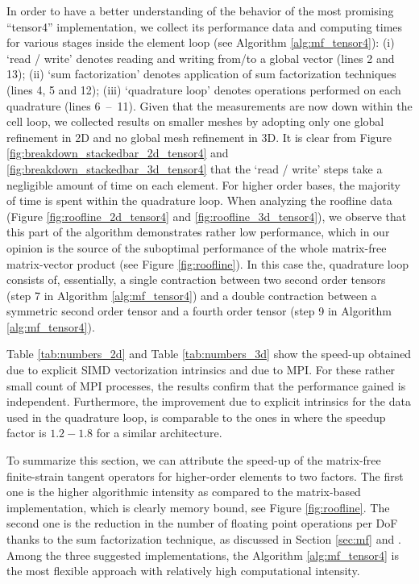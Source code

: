 \documentclass[times,doublespace]{nmeauth}
\newcommand{\changeDD}[1]{#1}
\newcommand{\changeJP}[1]{#1}
\begin{document}
\changeDD{
In order to have a better understanding of the behavior of the most promising ``tensor4'' implementation,
we collect its performance data and computing times for various stages inside the element loop (see Algorithm \ref{alg:mf_tensor4}):
(i) `read / write' denotes reading and writing from/to a global vector (\changeJP{lines 2 and 13});
(ii) `sum factorization' denotes application of sum factorization techniques (\changeJP{lines} 4, 5 and 12);
(iii) `quadrature loop' denotes operations performed on each quadrature (\changeJP{lines \mbox{6 -- 11}}).
Given that the measurements are now down within the cell loop, we collected results on smaller meshes by adopting only one
global refinement in 2D and no global mesh refinement in 3D.
It is clear from Figure \ref{fig:breakdown_stackedbar_2d_tensor4} and  \ref{fig:breakdown_stackedbar_3d_tensor4} that the
`read / write' steps take a negligible amount of time on each element.
For higher order bases, the majority of time is spent within the quadrature loop.
When analyzing the roofline data (Figure \ref{fig:roofline_2d_tensor4} and \ref{fig:roofline_3d_tensor4}),
we observe that this part of the algorithm demonstrates rather low performance, which in our opinion is the source of the
suboptimal performance of the whole matrix-free matrix-vector product (see Figure \ref{fig:roofline}).
In this case the, quadrature loop consists of, essentially, a
single contraction between two second order tensors (step 7 in Algorithm \ref{alg:mf_tensor4}) and a
double contraction between a symmetric second order tensor and a fourth order tensor (step 9 in Algorithm \ref{alg:mf_tensor4}).
}



\changeDD{
Table \ref{tab:numbers_2d} and Table \ref{tab:numbers_3d} show the speed-up obtained due to explicit SIMD vectorization intrinsics and due to MPI. For these rather small count of MPI processes, the results confirm that the performance gained is independent. Furthermore, the improvement due to explicit intrinsics for the data used in the quadrature loop, is comparable to the ones in \cite[Figure 6]{kronbichler2017fastcomputer} where the speedup factor is $1.2-1.8$ for a similar architecture.
}

\changeDD{
To summarize this section, we can attribute the speed-up of the matrix-free finite-strain tangent operators for higher-order elements to two factors.
The first one is the higher algorithmic intensity as compared to the matrix-based implementation, which is clearly memory
bound, see Figure \ref{fig:roofline}.
The second one is the reduction in the number of floating point operations per DoF thanks to the sum factorization technique, as discussed in
Section \ref{sec:mf} and \cite[Section 2.4]{kronbichler12}.
Among the three suggested implementations, the Algorithm \ref{alg:mf_tensor4} is the most flexible approach with relatively high computational intensity.
}
\end{document}
